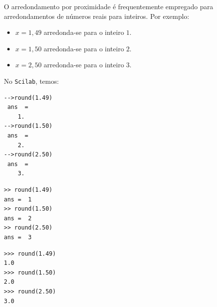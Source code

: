 \begin{obs}
  O arredondamento por proximidade é frequentemente empregado para arredondamentos de números reais para inteiros. Por exemplo:
  \begin{itemize}
  \item $x=1,49$ arredonda-se para o inteiro $1$.
  \item $x=1,50$ arredonda-se para o inteiro $2$.
  \item $x=2,50$ arredonda-se para o inteiro $3$.
  \end{itemize}
\ifisscilab
No \verb+Scilab+, temos:
\begin{verbatim}
-->round(1.49)
 ans  =
    1.
-->round(1.50)
 ans  =
    2.
-->round(2.50)
 ans  =
    3.
\end{verbatim}
\fi
\ifisoctave
\begin{verbatim}
>> round(1.49)
ans =  1
>> round(1.50)
ans =  2
>> round(2.50)
ans =  3
\end{verbatim}
\fi
\ifispython
\begin{verbatim}
>>> round(1.49)
1.0
>>> round(1.50)
2.0
>>> round(2.50)
3.0
\end{verbatim}
\fi
\end{obs}


